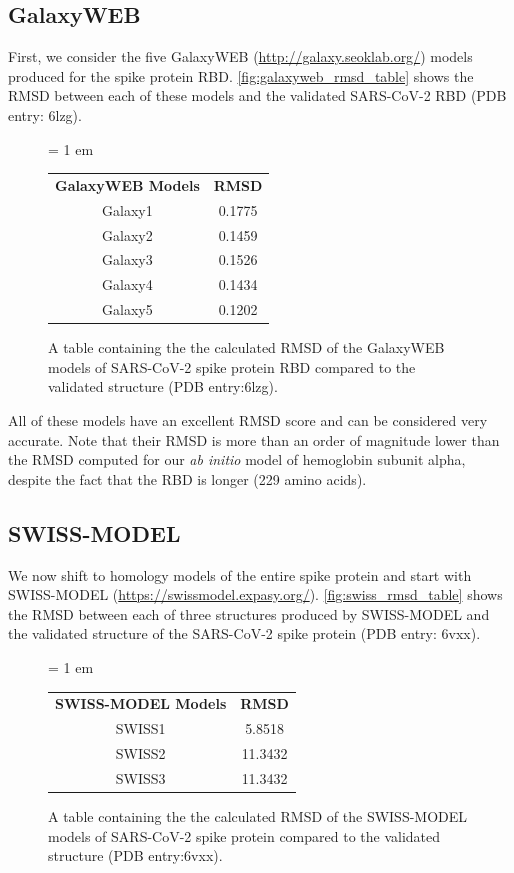 \FloatBarrier
{}
\subsection{GalaxyWEB}

First, we consider the five GalaxyWEB (\url{http://galaxy.seoklab.org/}) models produced for the spike protein RBD. \autoref{fig:galaxyweb_rmsd_table} shows the RMSD between each of these models and the validated SARS-CoV-2 RBD (PDB entry: 6lzg).\\

\begin{figure}[h]
	\centering
	\tabcolsep = 1 em
	\mySfFamily
	\begin{tabular}{c c}
		\textbf{GalaxyWEB Models} & \textbf{RMSD} \\
		Galaxy1 & 0.1775 \\
		Galaxy2 & 0.1459 \\
		Galaxy3 & 0.1526 \\
		Galaxy4 & 0.1434 \\
		Galaxy5 & 0.1202 \\
	\end{tabular}
	\caption{A table containing the the calculated RMSD of the GalaxyWEB models of SARS-CoV-2 spike protein RBD compared to the validated structure (PDB entry:6lzg).}
	\label{fig:galaxyweb_rmsd_table}
\end{figure}

All of these models have an excellent RMSD score and can be considered very accurate. Note that their RMSD is more than an order of magnitude lower than the RMSD computed for our \textit{ab initio} model of hemoglobin subunit alpha, despite the fact that the RBD is longer (229 amino acids).

\FloatBarrier
{}
\subsection{SWISS-MODEL}

We now shift to homology models of the entire spike protein and start with SWISS-MODEL (\url{https://swissmodel.expasy.org/}). \autoref{fig:swiss_rmsd_table} shows the RMSD between each of three structures produced by SWISS-MODEL and the validated structure of the SARS-CoV-2 spike protein (PDB entry: 6vxx).\\

\begin{figure}[h]
	\centering
	\tabcolsep = 1 em
	\mySfFamily
	\begin{tabular}{c c}
		\textbf{SWISS-MODEL Models} & \textbf{RMSD} \\
		SWISS1 & 5.8518 \\
		SWISS2 & 11.3432 \\
		SWISS3 & 11.3432 \\
	\end{tabular}
	\caption{A table containing the the calculated RMSD of the SWISS-MODEL models of SARS-CoV-2 spike protein compared to the validated structure (PDB entry:6vxx).}
	\label{fig:swiss_rmsd_table}
\end{figure}

